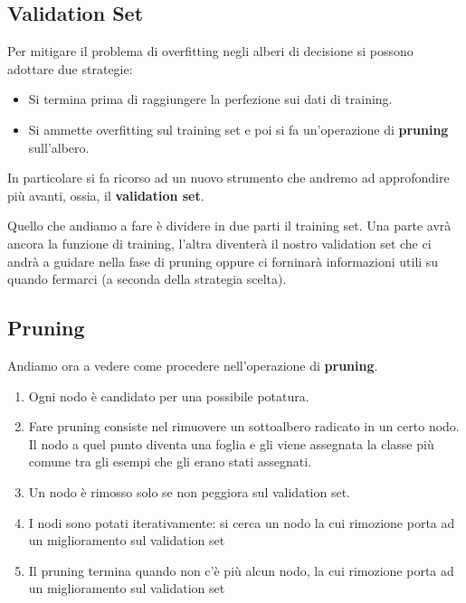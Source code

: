 \subsection{Validation Set}
Per mitigare il problema di overfitting negli alberi di decisione si possono adottare due strategie:
\begin{itemize}
	\item Si termina prima di raggiungere la perfezione sui dati di training.
	\item Si ammette overfitting sul training set e poi si fa un'operazione di \textbf{pruning} sull'albero.
\end{itemize}
In particolare si fa ricorso ad un nuovo strumento che andremo ad approfondire pi\`u avanti, ossia, il
\textbf{validation set}.

Quello che andiamo a fare \`e dividere in due parti il training set. Una parte avr\`a ancora la funzione di training,
l'altra diventer\`a il nostro validation set che ci andr\`a a guidare nella fase di pruning oppure ci forninar\`a
informazioni utili su quando fermarci (a seconda della strategia scelta).

\subsection{Pruning}
Andiamo ora a vedere come procedere nell'operazione di \textbf{pruning}.
\begin{enumerate}
	\item Ogni nodo \`e candidato per una possibile potatura.
	\item Fare pruning consiste nel rimuovere un sottoalbero radicato in un certo nodo. Il nodo a quel punto diventa una
	      foglia e gli viene assegnata la classe pi\`u comune tra gli esempi che gli erano stati assegnati.
	\item Un nodo \`e rimosso solo se non peggiora sul validation set.
	\item I nodi sono potati iterativamente: si cerca un nodo la cui rimozione porta ad un miglioramento sul validation
	      set
	\item Il pruning termina quando non c'\`e pi\`u alcun nodo, la cui rimozione porta ad un miglioramento sul validation
	      set
\end{enumerate}


